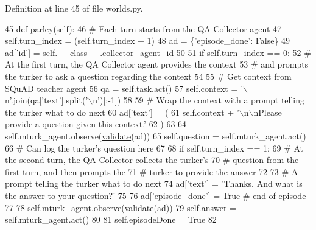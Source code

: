Definition at line 45 of file worlds.\+py.


\begin{DoxyCode}
45     \textcolor{keyword}{def }parley(self):
46         \textcolor{comment}{# Each turn starts from the QA Collector agent}
47         self.turn\_index = (self.turn\_index + 1) %
48         ad = \{\textcolor{stringliteral}{'episode\_done'}: \textcolor{keyword}{False}\}
49         ad[\textcolor{stringliteral}{'id'}] = self.\_\_class\_\_.collector\_agent\_id
50 
51         \textcolor{keywordflow}{if} self.turn\_index == 0:
52             \textcolor{comment}{# At the first turn, the QA Collector agent provides the context}
53             \textcolor{comment}{# and prompts the turker to ask a question regarding the context}
54 
55             \textcolor{comment}{# Get context from SQuAD teacher agent}
56             qa = self.task.act()
57             self.context = \textcolor{stringliteral}{'\(\backslash\)n'}.join(qa[\textcolor{stringliteral}{'text'}].split(\textcolor{stringliteral}{'\(\backslash\)n'})[:-1])
58 
59             \textcolor{comment}{# Wrap the context with a prompt telling the turker what to do next}
60             ad[\textcolor{stringliteral}{'text'}] = (
61                 self.context + \textcolor{stringliteral}{'\(\backslash\)n\(\backslash\)nPlease provide a question given this context.'}
62             )
63 
64             self.mturk\_agent.observe(\hyperlink{namespaceparlai_1_1core_1_1worlds_afc3fad603b7bce41dbdc9cdc04a9c794}{validate}(ad))
65             self.question = self.mturk\_agent.act()
66             \textcolor{comment}{# Can log the turker's question here}
67 
68         \textcolor{keywordflow}{if} self.turn\_index == 1:
69             \textcolor{comment}{# At the second turn, the QA Collector collects the turker's}
70             \textcolor{comment}{# question from the first turn, and then prompts the}
71             \textcolor{comment}{# turker to provide the answer}
72 
73             \textcolor{comment}{# A prompt telling the turker what to do next}
74             ad[\textcolor{stringliteral}{'text'}] = \textcolor{stringliteral}{'Thanks. And what is the answer to your question?'}
75 
76             ad[\textcolor{stringliteral}{'episode\_done'}] = \textcolor{keyword}{True}  \textcolor{comment}{# end of episode}
77 
78             self.mturk\_agent.observe(\hyperlink{namespaceparlai_1_1core_1_1worlds_afc3fad603b7bce41dbdc9cdc04a9c794}{validate}(ad))
79             self.answer = self.mturk\_agent.act()
80 
81             self.episodeDone = \textcolor{keyword}{True}
82 
\end{DoxyCode}

